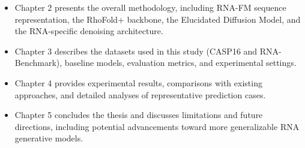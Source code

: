 \bigskip


\begin{itemize}
    \item{Chapter 2} presents the overall methodology, including RNA-FM sequence representation, 
          the RhoFold+ backbone, the Elucidated Diffusion Model, and the RNA-specific denoising architecture.

    \item{Chapter 3} describes the datasets used in this study (CASP16 and RNA-Benchmark)\cite{Ludaic2025limits}, 
          baseline models, evaluation metrics, and experimental settings.

    \item{Chapter 4} provides experimental results, comparisons with existing approaches, 
          and detailed analyses of representative prediction cases.

    \item{Chapter 5} concludes the thesis and discusses limitations and future directions, 
          including potential advancements toward more generalizable RNA generative models.
\end{itemize}
